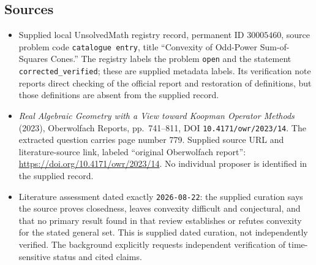 \documentclass[11pt]{article}
\begin{document}
\subsection{Sources}
\begin{itemize}
\item Supplied local UnsolvedMath registry record, permanent ID \(30005460\), source problem code \texttt{catalogue entry}, title ``Convexity of Odd-Power Sum-of-Squares Cones.'' The registry labels the problem \texttt{open} and the statement \texttt{corrected\_verified}; these are supplied metadata labels. Its verification note reports direct checking of the official report and restoration of definitions, but those definitions are absent from the supplied record.
\item \emph{Real Algebraic Geometry with a View toward Koopman Operator Methods} (2023), Oberwolfach Reports, pp.\ 741--811, DOI \texttt{10.4171/owr/2023/14}. The extracted question carries page number 779. Supplied source URL and literature-source link, labeled ``original Oberwolfach report'': \url{https://doi.org/10.4171/owr/2023/14}. No individual proposer is identified in the supplied record.
\item Literature assessment dated exactly \texttt{2026-08-22}: the supplied curation says the source proves closedness, leaves convexity difficult and conjectural, and that no primary result found in that review establishes or refutes convexity for the stated general set. This is supplied dated curation, not independently verified. The background explicitly requests independent verification of time-sensitive status and cited claims.
\end{itemize}
\end{document}

